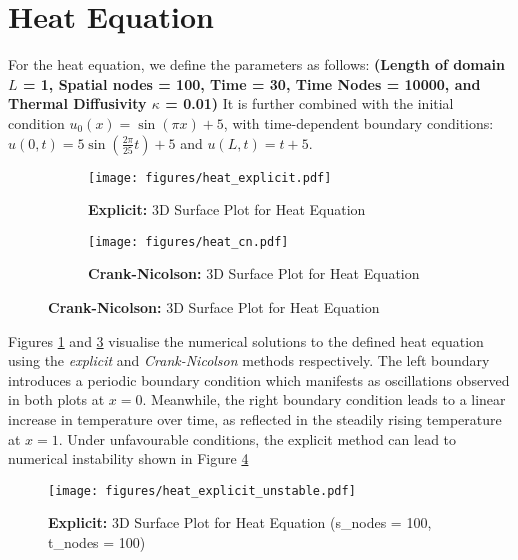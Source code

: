 %

\section{Heat Equation}\label{sec:heat_equation-results}
For the heat equation, we define the parameters as follows: \textbf{(Length of domain $L$ = 1, Spatial nodes = 100, Time = 30, Time Nodes = 10000, and Thermal Diffusivity $\kappa$ = 0.01)} It is further combined with the initial condition $u_0(x) = \sin(\pi x) + 5$, with time-dependent boundary conditions: $u(0,t) = 5 \sin\left(\frac{2 \pi}{25} t \right) + 5$ and $u(L,t) = t+5$.

\begin{figure}[H]
    \centering
    \begin{subfigure}[t]{0.45\textwidth}
        \centering
        \texttt{[image: figures/heat\_explicit.pdf]}
        \caption{\textbf{Explicit:} 3D Surface Plot for Heat Equation}
        \label{fig:heat-explicit-3d}
    \end{subfigure}
    \hfill
    \begin{subfigure}[t]{0.45\textwidth}
        \centering
        \texttt{[image: figures/heat\_cn.pdf]}
        \caption{\textbf{Crank-Nicolson:} 3D Surface Plot for Heat Equation}
        \label{fig:heat-cn-3d}
    \end{subfigure}
\end{figure}

Figures \ref{fig:heat-explicit-3d} and \ref{fig:heat-cn-3d} visualise the numerical solutions to the defined heat equation using the \textit{explicit} and \textit{Crank-Nicolson} methods respectively. The left boundary introduces a periodic boundary condition which manifests as oscillations observed in both plots at $x=0$. Meanwhile, the right boundary condition leads to a linear increase in temperature over time, as reflected in the steadily rising temperature at $x=1$. Under unfavourable conditions, the explicit method can lead to numerical instability shown in Figure \ref{fig:heat-explicit-unstable}

\begin{figure}[H]
    \centering
    \texttt{[image: figures/heat\_explicit\_unstable.pdf]}
    \caption{\textbf{Explicit:} 3D Surface Plot for Heat Equation (s\_nodes = 100, t\_nodes = 100)}
    \label{fig:heat-explicit-unstable}
\end{figure}

